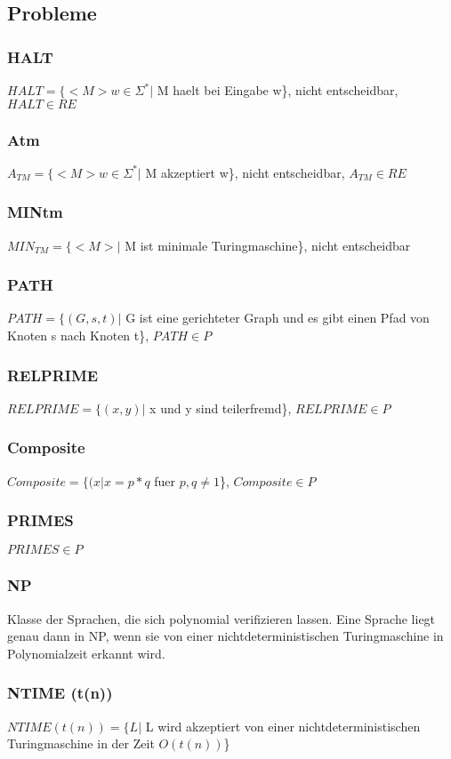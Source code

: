 \documentclass[a4paper]{scrreprt}
\begin{document}
\subsection{Probleme}
\subsubsection{HALT} $HALT = \{<M> w \in \Sigma^*|$ M haelt bei Eingabe w\}, nicht entscheidbar, $HALT \in RE$
\subsubsection{Atm} $A_{TM} = \{<M> w \in \Sigma^*|$ M akzeptiert w\}, nicht entscheidbar, $A_{TM} \in RE$
\subsubsection{MINtm} $MIN_{TM} = \{<M>|$ M ist minimale Turingmaschine\}, nicht entscheidbar
\subsubsection{PATH} $PATH = \{(G, s, t)|$ G ist eine gerichteter Graph und es gibt einen Pfad von Knoten s nach Knoten t\}, $PATH \in P$
\subsubsection{RELPRIME} $RELPRIME = \{(x, y)|$ x und y sind teilerfremd\}, $RELPRIME \in P$
\subsubsection{Composite} $Composite = \{(x|x = p * q$ fuer $p,q \neq 1$\}, $Composite \in P$
\subsubsection{PRIMES} $PRIMES \in P$
\subsubsection{NP} Klasse der Sprachen, die sich polynomial verifizieren lassen. Eine Sprache liegt genau dann in NP, wenn sie von einer nichtdeterministischen Turingmaschine in Polynomialzeit erkannt wird.
\subsubsection{NTIME (t(n))} $NTIME (t(n)) = \{L|$ L wird akzeptiert von einer nichtdeterministischen Turingmaschine in der Zeit $O(t(n))$\}
\end{document}
